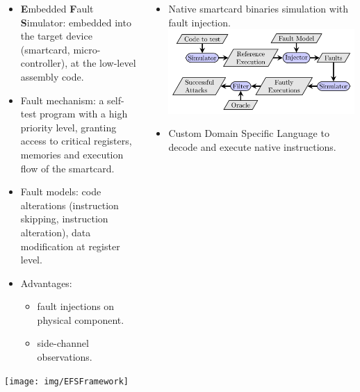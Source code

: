 \documentclass[final]{beamer}
\begin{document}
\begin{frame}[fragile]{}
\begin{tcolorbox}[adjusted title={\centering \Large Fault simulators}]
\begin{columns}[t]
\begin{column}{0.31\linewidth}
\begin{tcolorbox}
\begin{itemize}
\item \textbf{E}mbedded \textbf{F}ault \textbf{S}imulator: embedded into the
target device (smartcard, micro-controller), at the low-level assembly code.
\item Fault mechanism: a self-test program with a high priority level, granting
access to critical registers, memories and execution flow of the smartcard.
\item Fault models: code alterations (instruction skipping, instruction
alteration), data modification at register level.
\item Advantages: 
\begin{itemize}
       \item fault injections on physical component.
       \item side-channel observations.
       \end{itemize}
       \end{itemize}
       \centering \texttt{[image: img/EFSFramework]}
    \end{tcolorbox}
    \end{column}
    \begin{column}{0.31\linewidth}
    \begin{tcolorbox}[
    colback=white, %
    colframe=gray!20, %
    coltext=black, %
    coltitle=black, %
    equal height group=A,
    boxrule=1mm,
    valign = center,
    adjusted title={\large CELTIC \normalsize (by CEA-LETI)}]
    \begin{itemize}
\item Native smartcard binaries simulation with fault injection.
	\vspace{4mm}
\includegraphics{img/celtic_workflow}
\item Custom Domain Specific Language to decode and execute native instructions.

\end{itemize}
\end{tcolorbox}
\end{column}
\end{columns}
\end{tcolorbox}
\end{frame}
\end{document}
